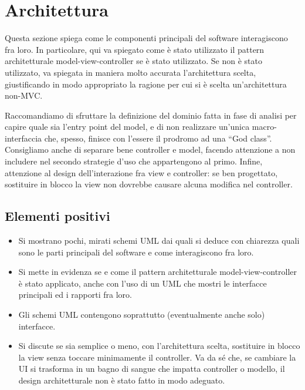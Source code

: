 \documentclass[a4paper,12pt]{report}
\begin{document}
\section{Architettura}

Questa sezione spiega come le componenti principali del software interagiscono fra loro.
%
In particolare, qui va spiegato come è stato utilizzato il pattern architetturale model-view-controller se è stato utilizzato.
%
Se non è stato utilizzato, va spiegata in maniera molto accurata l'architettura scelta, giustificando in modo appropriato la ragione per cui si è scelta un'architettura non-MVC.

Raccomandiamo di sfruttare la definizione del dominio fatta in fase di analisi per capire quale sia l'entry point del model, e di non realizzare un'unica macro-interfaccia che, spesso, finisce con l'essere il prodromo ad una ``God class''.
%
Consigliamo anche di separare bene controller e model, facendo attenzione a non includere nel secondo strategie d'uso che appartengono al primo.
%
Infine, attenzione al design dell'interazione fra view e controller: se ben progettato, sostituire in blocco la view non dovrebbe causare alcuna modifica nel controller.

\subsection*{Elementi positivi}
\begin{itemize}
 \item Si mostrano pochi, mirati schemi UML dai quali si deduce con chiarezza quali sono le parti principali del software e come interagiscono fra loro.
 \item Si mette in evidenza se e come il pattern architetturale model-view-controller è stato applicato, anche con l'uso di un UML che mostri le interfacce principali ed i rapporti fra loro.
 \item Gli schemi UML contengono soprattutto (eventualmente anche solo) interfacce.
 \item Si discute se sia semplice o meno, con l'architettura scelta, sostituire in blocco la view senza toccare minimamente il controller. Va da sé che, se cambiare la UI si trasforma in un bagno di sangue che impatta controller o modello, il design architetturale non è stato fatto in modo adeguato.
\end{itemize}
\end{document}
